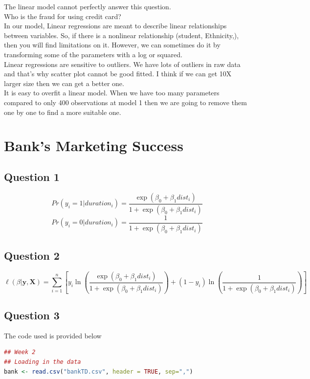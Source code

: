\documentclass[11pt]{article}
\begin{document}
{The linear model cannot perfectly answer this question.\\

Who is the fraud for using credit card?\\

In our model, Linear regressions are meant to describe linear relationships between variables. So, if there is a nonlinear relationship (student, Ethnicity,), then you will find limitations on it. However, we can sometimes do it by transforming some of the parameters with a log or squared.\\

Linear regressions are sensitive to outliers. We have lots of outliers in raw data and that’s why scatter plot cannot be good fitted. I think if we can get 10X larger size then we can get a better one.\\

It is easy to overfit a linear model.  When we have too many parameters compared to only 400 observations at model 1 then we are going to remove them one by one to find a more suitable one.


\section*{Bank's Marketing Success}
\subsection*{Question 1}
$$Pr(y_i = 1|duration_i) = \frac{\exp(\beta_0+\beta_1dist_i)}{1+\exp(\beta_0+\beta_1dist_i)}$$ 
$$Pr(y_i = 0|duration_i) = \frac{1}{1+\exp(\beta_0+\beta_1dist_i)}$$ 


\subsection*{Question 2}
$$\ell(\beta|\mathbf{y},\mathbf{X}) = \sum\limits_{i=1}^n \left[ y_i \ln{\left( \frac{\exp(\beta_0+\beta_1dist_i)}{1+\exp(\beta_0+\beta_1dist_i)}\right)} + (1-y_i) \ln{\left( \frac{1}{1+\exp(\beta_0+\beta_1dist_i)}\right)}\right]$$


\subsection*{Question 3}
The code used is provided below
\begin{lstlisting}[language=R]
## Week 2
## Loading in the data
bank <- read.csv("bankTD.csv", header = TRUE, sep=",")


\end{lstlisting}}
\end{document}
